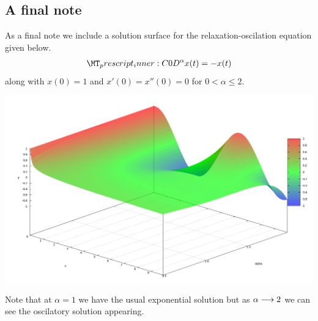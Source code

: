 \subsection{A final note}

As a final note we include a solution surface for the relaxation-oscilation equation given below.
\begin{align}
  \prescript{C}{0}{D}^\alpha x(t) = - x(t)
\end{align}
along with $ x(0) = 1 $ and $ x'(0) = x''(0) = 0 $ for $ 0 < \alpha \leq 2 $.

\includegraphics[scale=0.3]{images/FDE_Solution_Surface_No_Label.png}

Note that at $ \alpha = 1 $ we have the usual exponential solution but as $ \alpha \longrightarrow 2 $ we can see the oscilatory solution appearing.



\clearpage 
